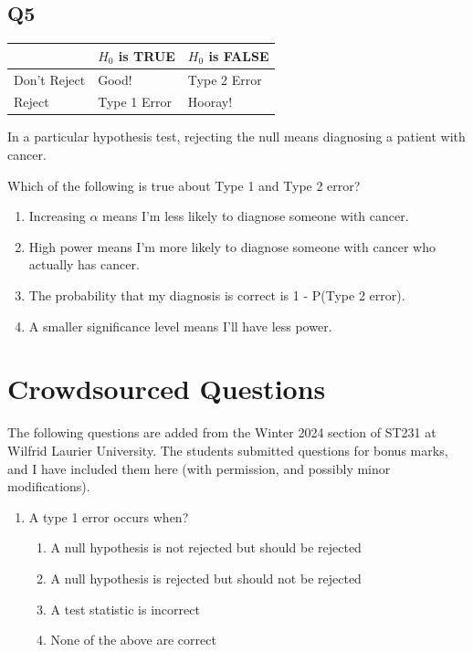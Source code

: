 \documentclass[
  letterpaper,
  DIV=11,
  numbers=noendperiod,
  oneside]{scrreprt}
\providecommand{\tightlist}{%
  \setlength{\itemsep}{0pt}\setlength{\parskip}{0pt}}\usepackage{longtable,booktabs,array}
\begin{document}
\hypertarget{q5}{%
\subsection{Q5}\label{q5}}

\begin{longtable}[]{@{}lll@{}}
\toprule\noalign{}
& \(H_0\) is TRUE & \(H_0\) is FALSE \\
\midrule\noalign{}
\endhead
\bottomrule\noalign{}
\endlastfoot
Don't Reject & Good! & Type 2 Error \\
Reject & Type 1 Error & Hooray! \\
\end{longtable}

In a particular hypothesis test, rejecting the null means diagnosing a
patient with cancer.

Which of the following is true about Type 1 and Type 2 error?

\pspace

\begin{enumerate}
\def\labelenumi{\arabic{enumi}.}
\tightlist
\item
  Increasing \(\alpha\) means I'm less likely to diagnose someone with
  cancer.
\item
  High power means I'm more likely to diagnose someone with cancer who
  actually has cancer.
\item
  The probability that my diagnosis is correct is 1 - P(Type 2 error).
\item
  A smaller significance level means I'll have less power.
\end{enumerate}

\hypertarget{crowdsourced-questions-8}{%
\section{Crowdsourced Questions}\label{crowdsourced-questions-8}}

The following questions are added from the Winter 2024 section of ST231
at Wilfrid Laurier University. The students submitted questions for
bonus marks, and I have included them here (with permission, and
possibly minor modifications).

\begin{enumerate}
\def\labelenumi{\arabic{enumi}.}
\tightlist
\item
  A type 1 error occurs when?

  \begin{enumerate}
  \def\labelenumii{\alph{enumii}.}
  \tightlist
  \item
    A null hypothesis is not rejected but should be rejected
  \item
    A null hypothesis is rejected but should not be rejected
  \item
    A test statistic is incorrect
  \item
    None of the above are correct
  \end{enumerate}
\end{enumerate}
\end{document}
